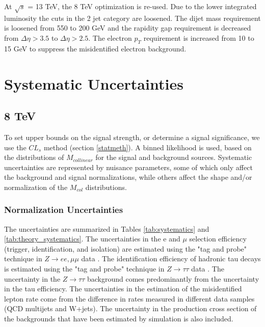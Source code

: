 \documentclass[oneside, letterpaper, oldfontcommands]{memoir}
\begin{document}
\qquad At $\sqrt{s}$ = 13 TeV, the 8 TeV optimization is re-used. Due to the lower integrated luminosity the cuts in the 2 jet category are loosened. The dijet mass requirement is loosened from 550 to 200 GeV and the rapidity gap requirement is decreased from $\Delta \eta > 3.5$ to $\Delta \eta > 2.5$. The electron $p_{T}$ requirement is increased from 10 to 15 GeV to suppress the misidentified electron background. 
\section{Systematic Uncertainties}\label{sysuncert}
\subsection{8 TeV}

\qquad To set upper bounds on the signal strength, or determine a signal significance, we use the $CL_{s}$ method (section \ref{statmeth}).  A binned likelihood is used, based on the distributions of $M_{collinear}$ for the signal and background sources. Systematic uncertainties are represented by nuisance parameters, some of which only affect the background and signal normalizations, while others affect the shape and/or normalization of the $M_{col}$ distributions. 

\subsubsection{Normalization Uncertainties}

\qquad The uncertainties are summarized in Tables \ref{tab:systematics} and \ref{tab:theory_systematics}. The uncertainties in the e and $\mu$ selection efficiency (trigger, identification, and isolation) are estimated using the "tag and probe" technique in $Z \rightarrow ee,\mu\mu$ data \cite{Chatrchyan:2014mua}. The identification efficiency of hadronic tau decays is estimated using the "tag and probe" technique in $Z \rightarrow \tau\tau$ data \cite{1748-0221-7-01-P01001}. The uncertainty in the $Z \rightarrow \tau\tau$ background comes predominantly from the uncertainty in the tau efficiency. The uncertainties in the estimation of the misidentified lepton rate come from the difference in rates measured in different data samples (QCD multijets and W+jets). The uncertainty in the production cross section of the backgrounds that have been estimated by simulation is also included.
\end{document}
